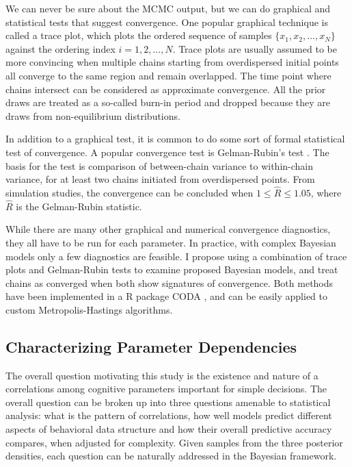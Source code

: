 \documentclass[12pt]{report}
\begin{document}
We can never be sure about the MCMC output, but we can do graphical and statistical tests that suggest convergence. One popular graphical technique is called a trace plot, which plots the ordered sequence of samples $\{x_1, x_2, \ldots, x_N\}$ against the ordering index $i = 1, 2, \ldots, N$. Trace plots are usually assumed to be more convincing when multiple chains starting from overdispersed initial points all converge to the same region and remain overlapped. The time point where chains intersect can be considered as approximate convergence. All the prior draws are treated as a so-called burn-in period and dropped because they are draws from non-equilibrium distributions.

In addition to a graphical test, it is common to do some sort of formal statistical test of convergence. A popular convergence test is Gelman-Rubin's test \citet{GelRub1992}. The basis for the test is comparison of between-chain variance to within-chain variance, for at least two chains initiated from overdispersed points. From simulation studies, the convergence can be concluded when $1 \leq \hat R \leq 1.05$, where $\hat R$ is the Gelman-Rubin statistic. 

While there are many other graphical and numerical convergence diagnostics, they all have to be run for each parameter. In practice, with complex Bayesian models only a few diagnostics are feasible. I propose using a combination of trace plots and Gelman-Rubin tests to examine proposed Bayesian models, and treat chains as converged when both show signatures of convergence. Both methods have been implemented in a R package CODA \citep{PluBes2006}, and can be easily applied to custom Metropolis-Hastings algorithms. 

\subsection{Characterizing Parameter Dependencies}

The overall question motivating this study is the existence and nature of a correlations among cognitive parameters important for simple decisions. The overall question can be broken up into three questions amenable to statistical analysis: what is the pattern of correlations, how well models predict different aspects of behavioral data structure and how their overall predictive accuracy compares, when adjusted for complexity. Given samples from the three posterior densities, each question can be naturally addressed in the Bayesian framework.  
    
\end{document}
